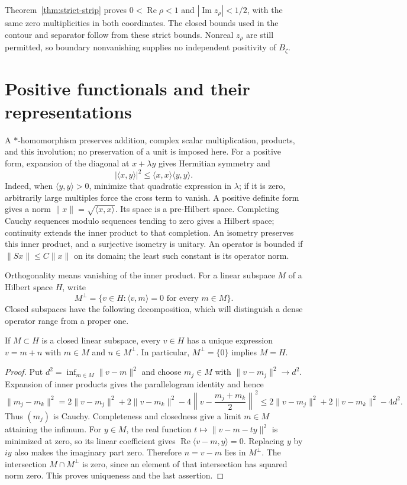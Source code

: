 Theorem~\ref{thm:strict-strip} proves
$0<\operatorname{Re}\rho<1$ and $|\operatorname{Im}z_\rho|<1/2$,
with the same zero multiplicities in both coordinates.
The closed bounds used in the contour and separator follow from these
strict bounds.  Nonreal $z_\rho$ are still permitted, so boundary
nonvanishing supplies no independent positivity of $B_\zeta$.

\section{Positive functionals and their representations}

A $*$-homomorphism preserves addition, complex scalar multiplication,
products, and this involution; no preservation of a unit is imposed here.
For a positive form, expansion of the diagonal at $x+\lambda y$ gives
Hermitian symmetry and
\[
 |\langle x,y\rangle|^2\leq\langle x,x\rangle\langle y,y\rangle.
\]
Indeed, when $\langle y,y\rangle>0$, minimize that quadratic expression in
$\lambda$; if it is zero, arbitrarily large multiples force the cross term
to vanish.  A positive definite form gives a norm
$\|x\|=\sqrt{\langle x,x\rangle}$.  Its space is a pre-Hilbert space.
Completing Cauchy sequences modulo sequences tending to zero gives a
Hilbert space; continuity extends the inner product to that completion.
An isometry preserves this inner product, and a surjective isometry is
unitary.  An operator is bounded if $\|Sx\|\leq C\|x\|$ on its domain;
the least such constant is its operator norm.

Orthogonality means vanishing of the inner product.  For a linear subspace
$M$ of a Hilbert space $H$, write
\[
 M^\perp=\{v\in H:\langle v,m\rangle=0\text{ for every }m\in M\}.
\]
Closed subspaces have the following decomposition, which will distinguish
a dense operator range from a proper one.

\begin{lemma}
\label{lem:weil-orthogonal-decomposition}
If $M\subset H$ is a closed linear subspace, every $v\in H$ has a unique
expression $v=m+n$ with $m\in M$ and $n\in M^\perp$.
In particular, $M^\perp=\{0\}$ implies $M=H$.
\end{lemma}
\begin{proof}
Put $d^2=\inf_{m\in M}\|v-m\|^2$ and choose $m_j\in M$ with
$\|v-m_j\|^2\to d^2$.  Expansion of inner products gives the
parallelogram identity and hence
\[
 \|m_j-m_k\|^2
 =2\|v-m_j\|^2+2\|v-m_k\|^2
      -4\left\|v-\frac{m_j+m_k}{2}\right\|^2
 \leq2\|v-m_j\|^2+2\|v-m_k\|^2-4d^2.
\]
Thus $(m_j)$ is Cauchy.  Completeness and closedness give a limit
$m\in M$ attaining the infimum.
For $y\in M$, the real function $t\mapsto\|v-m-ty\|^2$ is minimized
at zero, so its linear coefficient gives
$\operatorname{Re}\langle v-m,y\rangle=0$.
Replacing $y$ by $iy$ also makes the imaginary part zero.
Therefore $n=v-m$ lies in $M^\perp$.
The intersection $M\cap M^\perp$ is zero, since an element of that
intersection has squared norm zero.  This proves uniqueness and the
last assertion.
\end{proof}

